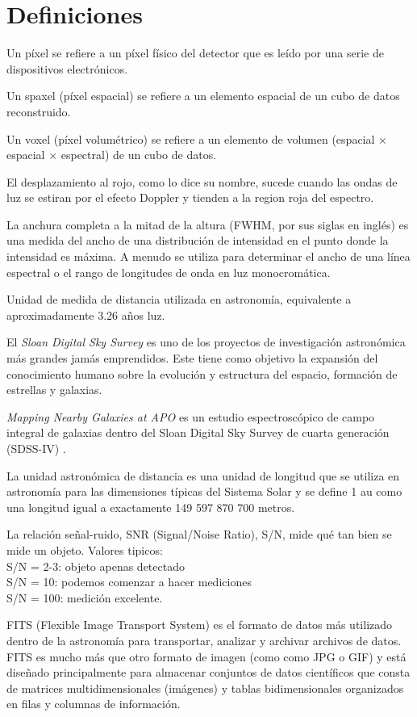 \documentclass[9pt,twocolumn,a4paper]{opticajnl}
\begin{document}
\section*{Definiciones}
\begin{description}[style=nextline]
  \item[pixel] Un píxel se refiere a un píxel físico del detector que es leído por una serie de dispositivos electrónicos.
  \item[spaxel] Un spaxel (píxel espacial) se refiere a un elemento espacial de un cubo de datos reconstruido.
  \item[voxel] Un voxel (píxel volumétrico) se refiere a un elemento de volumen (espacial × espacial × espectral) de un cubo de datos. 
  \item[redshift] El desplazamiento al rojo, como lo dice su nombre, sucede cuando las ondas de luz se estiran por el efecto Doppler y tienden a la region roja del espectro.
  \item[FWHM]La anchura completa a la mitad de la altura (FWHM, por sus siglas en inglés) es una medida del ancho de una distribución de intensidad en el punto donde la intensidad es máxima. A menudo se utiliza para determinar el ancho de una línea espectral o el rango de longitudes de onda en luz monocromática. 
  \item[pársec] Unidad de medida de distancia utilizada en astronomía, equivalente a aproximadamente 3.26 años luz.
  \item[SDSS] El \textit{Sloan Digital Sky Survey} es uno de los proyectos de investigación astronómica más grandes jamás emprendidos. Este tiene como objetivo la expansión del conocimiento humano sobre la evolución y estructura del espacio, formación de estrellas y galaxias.
  \item[MaNGA] \textit{Mapping Nearby Galaxies at APO} es un estudio espectroscópico de campo integral de galaxias dentro del Sloan Digital Sky Survey de cuarta generación (SDSS-IV) \cite{weijmans2015manga}.
  \item[Unidad Astronomica / au] La unidad astronómica de distancia es una unidad de longitud que se utiliza en astronomía para las dimensiones típicas del Sistema Solar y se define 1 au como una longitud igual a exactamente 149 597 870 700 metros.
  \item[S/N] La relación señal-ruido, SNR (Signal/Noise Ratio), S/N, mide qué tan bien se mide un objeto. Valores tipicos:\\
  S/N = 2-3: objeto apenas detectado\\
  S/N = 10: podemos comenzar a hacer mediciones\\
  S/N = 100: medición excelente.\\
  \item[Archivos .fits] FITS (Flexible Image Transport System) es el formato de datos más utilizado dentro de la astronomía para transportar, analizar y archivar archivos de datos. FITS es mucho más que otro formato de imagen (como como JPG o GIF) y está diseñado principalmente para almacenar conjuntos de datos científicos que consta de matrices multidimensionales (imágenes) y tablas bidimensionales organizados en filas y columnas de información.
\end{description}

\printbibliography
\end{document}
